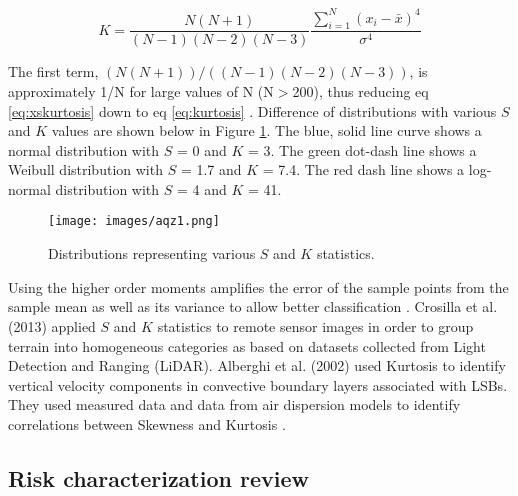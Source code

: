 \begin{equation}
\label{eq:xskurtosis}
K = \frac{N(N+1)}{(N-1)(N-2)(N-3)} \frac{\sum_{i=1}^{N}\left (x_{i}-\bar{x} \right )^{4}}{\sigma^{4}}
\end{equation}

The first term, $(N(N+1))/((N-1)(N-2)(N-3))$, is approximately 1/N for large values of N (N$>$200), thus reducing eq \ref{eq:xskurtosis} down to eq \ref{eq:kurtosis} \citep{Cox2010}.  Difference of distributions with various $S$ and $K$ values are shown below in Figure \ref{fig:SKcurves}.  The blue, solid line curve shows a normal distribution with $S$ = 0 and $K$ = 3. The green dot-dash line shows a Weibull distribution with $S$ = 1.7 and $K$ = 7.4.  The red dash line shows a log-normal distribution with $S$ = 4 and $K$ = 41. 
%
\begin{figure}
\texttt{[image: images/aqz1.png]} 
\caption{Distributions representing various $S$ and $K$ statistics.}
\label{fig:SKcurves}
\end{figure}
%
Using the higher order moments amplifies the error of the sample points from the sample mean as well as its variance to allow better classification \citep{Seo2011}.  Crosilla et al. (2013) applied $S$ and $K$ statistics to remote sensor images in order to group terrain into homogeneous categories as based on datasets collected from Light Detection and Ranging (LiDAR).  Alberghi et al. (2002) used Kurtosis to identify vertical velocity components in convective boundary layers associated with LSBs.  They used measured data and data from air dispersion models to identify correlations between Skewness and Kurtosis \citep{Alberghi2002}.
\clearpage
\subsection{Risk characterization review}

